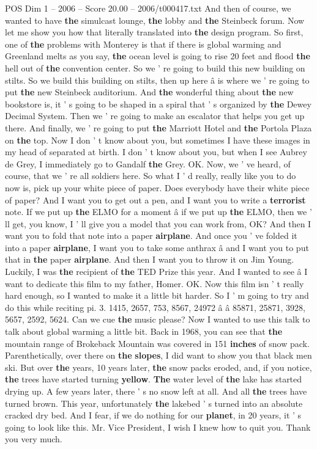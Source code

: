 \begin{textsample}{POS Dim 1 – 2006 – Score 20.00 – 2006/t000417.txt}
And then of course, we wanted to have \textbf{the} simulcast lounge, \textbf{the} lobby and \textbf{the} Steinbeck forum.
Now let me show you how that literally translated into \textbf{the} design program.
So first, one of \textbf{the} problems with Monterey is that if there is global warming and Greenland melts as you say, \textbf{the} ocean level is going to rise 20 feet and flood \textbf{the} hell out of \textbf{the} convention center.
So we ' re going to build this new building on stilts.
So we build this building on stilts, then up here â is where we ' re going to put \textbf{the} new Steinbeck auditorium.
And \textbf{the} wonderful thing about \textbf{the} new bookstore is, it ' s going to be shaped in a spiral that ' s organized by \textbf{the} Dewey Decimal System.
Then we ' re going to make an escalator that helps you get up there.
And finally, we ' re going to put \textbf{the} Marriott Hotel and \textbf{the} Portola Plaza on \textbf{the} top.
Now I don ' t know about you, but sometimes I have these images in my head of separated at birth.
I don ' t know about you, but when I see Aubrey de Grey, I immediately go to Gandalf \textbf{the} Grey.
OK.
Now, we ' ve heard, of course, that we ' re all soldiers here.
So what I ' d really, really like you to do now is, pick up your white piece of paper.
Does everybody have their white piece of paper?
And I want you to get out a pen, and I want you to write a \textbf{terrorist} note.
If we put up \textbf{the} ELMO for a moment â if we put up \textbf{the} ELMO, then we ' ll get, you know, I ' ll give you a model that you can work from, OK?
And then I want you to fold that note into a paper \textbf{airplane}.
And once you ' ve folded it into a paper \textbf{airplane}, I want you to take some anthrax â and I want you to put that in \textbf{the} paper \textbf{airplane}.
And then I want you to throw it on Jim Young.
Luckily, I was \textbf{the} recipient of \textbf{the} TED Prize this year.
And I wanted to see â I want to dedicate this film to my father, Homer.
OK.
Now this film isn ' t really hard enough, so I wanted to make it a little bit harder.
So I ' m going to try and do this while reciting pi. 3. 1415, 2657, 753, 8567, 24972 â â 85871, 25871, 3928, 5657, 2592, 5624.
Can we cue \textbf{the} music please?
Now I wanted to use this talk to talk about global warming a little bit.
Back in 1968, you can see that \textbf{the} mountain range of Brokeback Mountain was covered in 151 \textbf{inches} of snow pack.
Parenthetically, over there on \textbf{the} \textbf{slopes}, I did want to show you that black men ski.
But over \textbf{the} years, 10 years later, \textbf{the} snow packs eroded, and, if you notice, \textbf{the} trees have started turning \textbf{yellow}. \textbf{The} water level of \textbf{the} lake has started drying up.
A few years later, there ' s no snow left at all.
And all \textbf{the} trees have turned brown.
This year, unfortunately \textbf{the} lakebed ' s turned into an absolute cracked dry bed.
And I fear, if we do nothing for our \textbf{planet}, in 20 years, it ' s going to look like this.
Mr.
Vice President, I wish I knew how to quit you.
Thank you very much.


\end{textsample}
